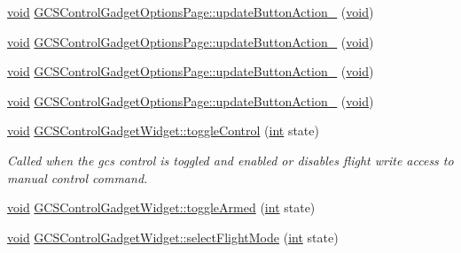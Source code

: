 \begin{DoxyCompactItemize}
\item 
\hyperlink{group___u_a_v_objects_plugin_ga444cf2ff3f0ecbe028adce838d373f5c}{void} \hyperlink{group___g_c_s_control_gadget_plugin_ga667ae55b05e2c319a622450298807d0d}{G\-C\-S\-Control\-Gadget\-Options\-Page\-::update\-Button\-Action\-\_} (\hyperlink{group___u_a_v_objects_plugin_ga444cf2ff3f0ecbe028adce838d373f5c}{void})
\item 
\hyperlink{group___u_a_v_objects_plugin_ga444cf2ff3f0ecbe028adce838d373f5c}{void} \hyperlink{group___g_c_s_control_gadget_plugin_ga90dee04d87421e1af638ad7b1dea6aa8}{G\-C\-S\-Control\-Gadget\-Options\-Page\-::update\-Button\-Action\-\_} (\hyperlink{group___u_a_v_objects_plugin_ga444cf2ff3f0ecbe028adce838d373f5c}{void})
\item 
\hyperlink{group___u_a_v_objects_plugin_ga444cf2ff3f0ecbe028adce838d373f5c}{void} \hyperlink{group___g_c_s_control_gadget_plugin_ga918d017e724202b8224174985267c978}{G\-C\-S\-Control\-Gadget\-Options\-Page\-::update\-Button\-Action\-\_} (\hyperlink{group___u_a_v_objects_plugin_ga444cf2ff3f0ecbe028adce838d373f5c}{void})
\item 
\hyperlink{group___u_a_v_objects_plugin_ga444cf2ff3f0ecbe028adce838d373f5c}{void} \hyperlink{group___g_c_s_control_gadget_plugin_ga9b65e1b928dfafa1fa9d78aaa39c16df}{G\-C\-S\-Control\-Gadget\-Options\-Page\-::update\-Button\-Action\-\_} (\hyperlink{group___u_a_v_objects_plugin_ga444cf2ff3f0ecbe028adce838d373f5c}{void})
\item 
\hyperlink{group___u_a_v_objects_plugin_ga444cf2ff3f0ecbe028adce838d373f5c}{void} \hyperlink{group___g_c_s_control_gadget_plugin_gafe60b9408fffe8389ea6b994b3d5c84e}{G\-C\-S\-Control\-Gadget\-Widget\-::toggle\-Control} (\hyperlink{ioapi_8h_a787fa3cf048117ba7123753c1e74fcd6}{int} state)
\begin{DoxyCompactList}\small\item\em Called when the gcs control is toggled and enabled or disables flight write access to manual control command. \end{DoxyCompactList}\item 
\hyperlink{group___u_a_v_objects_plugin_ga444cf2ff3f0ecbe028adce838d373f5c}{void} \hyperlink{group___g_c_s_control_gadget_plugin_ga77dc1ed2344ac4440aa6348ee32d3104}{G\-C\-S\-Control\-Gadget\-Widget\-::toggle\-Armed} (\hyperlink{ioapi_8h_a787fa3cf048117ba7123753c1e74fcd6}{int} state)
\item 
\hyperlink{group___u_a_v_objects_plugin_ga444cf2ff3f0ecbe028adce838d373f5c}{void} \hyperlink{group___g_c_s_control_gadget_plugin_gab1ae0cb7fd085ad31a9a7b5d6923f8d4}{G\-C\-S\-Control\-Gadget\-Widget\-::select\-Flight\-Mode} (\hyperlink{ioapi_8h_a787fa3cf048117ba7123753c1e74fcd6}{int} state)

\end{DoxyCompactItemize}
